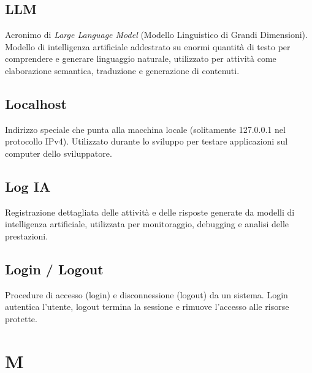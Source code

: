 \documentclass[a4paper, 11pt, oneside]{scrartcl} %
\begin{document}
\subsection*{LLM}
Acronimo di \textit{Large Language Model} (Modello Linguistico di Grandi Dimensioni). Modello di intelligenza artificiale addestrato su enormi quantità di testo per comprendere e generare linguaggio naturale, utilizzato per attività come elaborazione semantica, traduzione e generazione di contenuti.
\vspace{0.5cm}

\subsection*{Localhost}


Indirizzo speciale che punta alla macchina locale (solitamente 127.0.0.1 nel protocollo IPv4). Utilizzato durante lo sviluppo per testare applicazioni sul computer dello sviluppatore.

\vspace{0.5cm}

\subsection*{Log IA}


Registrazione dettagliata delle attività e delle risposte generate da modelli di intelligenza artificiale, utilizzata per monitoraggio, debugging e analisi delle prestazioni.

\vspace{0.5cm}

\subsection*{Login / Logout}


Procedure di accesso (login) e disconnessione (logout) da un sistema. Login autentica l'utente, logout termina la sessione e rimuove l'accesso alle risorse protette.

\vspace{0.5cm}



\section*{M}
\end{document}
